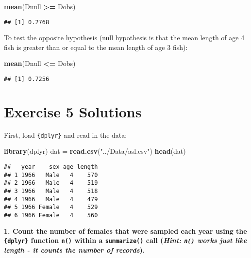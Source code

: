 \documentclass[]{book}
\newenvironment{Shaded}{\begin{snugshade}}{\end{snugshade}}
\newcommand{\KeywordTok}[1]{\textcolor[rgb]{0.13,0.29,0.53}{\textbf{#1}}}
\newcommand{\StringTok}[1]{\textcolor[rgb]{0.31,0.60,0.02}{#1}}
\newcommand{\OperatorTok}[1]{\textcolor[rgb]{0.81,0.36,0.00}{\textbf{#1}}}
\newcommand{\NormalTok}[1]{#1}
\theoremstyle{definition}
\theoremstyle{definition}
\theoremstyle{definition}
\theoremstyle{remark}
\begin{document}
\begin{Shaded}
\begin{Highlighting}[]
\KeywordTok{mean}\NormalTok{(Dnull }\OperatorTok{>=}\StringTok{ }\NormalTok{Dobs)}
\end{Highlighting}
\end{Shaded}

\begin{verbatim}
## [1] 0.2768
\end{verbatim}

To test the opposite hypothesis (null hypothesis is that the mean length
of age 4 fish is greater than or equal to the mean length of age 3
fish):

\begin{Shaded}
\begin{Highlighting}[]
\KeywordTok{mean}\NormalTok{(Dnull }\OperatorTok{<=}\StringTok{ }\NormalTok{Dobs)}
\end{Highlighting}
\end{Shaded}

\begin{verbatim}
## [1] 0.7256
\end{verbatim}

\hypertarget{ex5-answers}{\section*{Exercise 5
Solutions}\label{ex5-answers}}

First, load \texttt{\{dplyr\}} and read in the data:

\begin{Shaded}
\begin{Highlighting}[]
\KeywordTok{library}\NormalTok{(dplyr)}
\NormalTok{dat =}\StringTok{ }\KeywordTok{read.csv}\NormalTok{(}\StringTok{"../Data/asl.csv"}\NormalTok{)}
\KeywordTok{head}\NormalTok{(dat)}
\end{Highlighting}
\end{Shaded}

\begin{verbatim}
##   year    sex age length
## 1 1966   Male   4    570
## 2 1966   Male   4    519
## 3 1966   Male   4    518
## 4 1966   Male   4    479
## 5 1966 Female   4    529
## 6 1966 Female   4    560
\end{verbatim}

\textbf{1. Count the number of females that were sampled each year using
the \texttt{\{dplyr\}} function \texttt{n()} within a
\texttt{summarize()} call (\emph{Hint: \texttt{n()} works just like
length - it counts the number of records}).}
\end{document}
